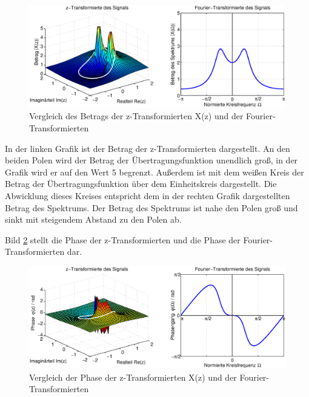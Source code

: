 \begin{figure}[H]
  \centerline{\includegraphics[width=1\textwidth]{Kapitel7/Bilder/image19.eps}}
  \caption{Vergleich des Betrags der z-Transformierten X(z) und der Fourier-Transformierten}
  \label{fig:VergleichTransformationzFourier2}
\end{figure}

\noindent In der linken Grafik ist der Betrag der z-Transformierten dargestellt. An den beiden Polen wird der Betrag der \"{U}bertragungsfunktion unendlich gro{\ss}, in der Grafik wird er auf den Wert 5 begrenzt. Au{\ss}erdem ist mit dem wei{\ss}en Kreis der Betrag der \"{U}bertragungsfunktion \"{u}ber dem Einheitskreis dargestellt. Die Abwicklung dieses Kreises entspricht dem in der rechten Grafik dargestellten Betrag des Spektrums. Der Betrag des Spektrums ist nahe den Polen gro{\ss} und sinkt mit steigendem Abstand zu den Polen ab.

\clearpage

\noindent Bild \ref{fig:VergleichTransformationzFourier3} stellt die Phase der z-Transformierten und die Phase der Fourier-Transformierten dar.

\begin{figure}[H]
  \centerline{\includegraphics[width=1\textwidth]{Kapitel7/Bilder/image20.eps}}
  \caption{Vergleich der Phase der z-Transformierten X(z) und der Fourier-Transformierten}
  \label{fig:VergleichTransformationzFourier3}
\end{figure}

